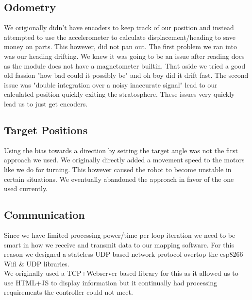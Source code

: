 \documentclass[12pt]{article}
\begin{document}
\subsection{Odometry}
We origionally didn't have encoders to keep track of our position and instead attempted to use the accelerometer to calculate displacement/heading to save money on parts. This however, did not pan out. The first problem we ran into was our heading drifting. We knew it was going to be an issue after reading docs as the module does not have a magnetometer builtin. That aside we tried a good old fassion "how bad could it possibly be" and oh boy did it drift fast. The second issue was "double integration over a noisy inaccurate signal" lead to our calculated position quickly exiting the stratosphere. These issues very quickly lead us to just get encoders.

\subsection{Target Positions}
Using the bias towards a direction by setting the target angle was not the first approach we used. We originally directly added a movement speed to the motors like we do for turning. This however caused the robot to become unstable in certain situations. We eventually abandoned the approach in favor of the one used currently.

\subsection{Communication}
Since we have limited processing power/time per loop iteration we need to be smart in how we receive and transmit data to our mapping software. For this reason we designed a stateless UDP based network protocol overtop the esp8266 Wifi \& UDP libraries. \cite{wifi_lib}\\

We originally used a TCP+Webserver based library for this as it allowed us to use HTML+JS to display information but it continually had processing requirements the controller could not meet.
\end{document}
